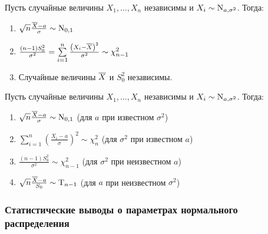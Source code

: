 \begin{namedthm}
Пусть случайные величины $X_1, \ldots, X_n$ независимы и ${X_i \sim \operatorname{\mathrm{N}}_{a,\sigma^{2}}}$. Тогда:
\begin{enumerate}
    \item $\sqrt{n} \frac{\overline{X}-a}{\sigma} \sim \operatorname{\mathrm{N}}_{0,1}$
    \item $\frac{(n-1) S_{0}^{2}}{\sigma^{2}}=\sum\limits_{i=1}^{n} \frac{\left(X_{i}-\overline{X}\right)^{2}}{\sigma^{2}} \sim \chi^{2}_{n-1}$
    \item Случайные величины $\overline{X}$ и $S_{0}^{2}$ независимы.
\end{enumerate}
\end{namedthm}
\begin{crlr}
    Пусть случайные величины $X_1, \ldots, X_n$ независимы и ${X_i \sim \operatorname{\mathrm{N}}_{a,\sigma^{2}}}$. Тогда:
    \begin{enumerate}
        \item $\sqrt{n} \frac{\overline{X}-a}{\sigma} \sim \operatorname{\mathrm{N}}_{0,1}$ (для $a$ при известном $\sigma^{2}$)
        \item $\sum\limits_{i=1}^{n}\left(\frac{X_{i}-a}{\sigma}\right)^{2} \sim \chi^{2}_{n}$ (для $\sigma^{2}$ при известном $a$)
        \item $\frac{(n-1) S_{0}^{2}}{\sigma^{2}} \sim \chi^{2}_{n-1}$ (для $\sigma^{2}$ при неизвестном $a$)
        \item $\sqrt{n} \frac{\overline{X}-a}{S_{0}} \sim \operatorname{\mathrm{T}}_{n-1}$ (для $a$ при неизвестном $\sigma^{2}$)
    \end{enumerate}
\end{crlr}

\subsubsection{Статистические выводы о параметрах нормального распределения}

